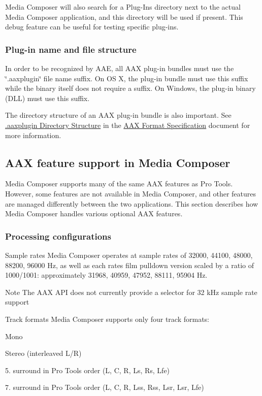 Media Composer will also search for a Plug-\/\+Ins directory next to the actual Media Composer application, and this directory will be used if present. This debug feature can be useful for testing specific plug-\/ins.

\hypertarget{a00361_subsection__media_composer_guide__file_name}{}\subsubsection{Plug-\/in name and file structure}\label{a00361_subsection__media_composer_guide__file_name}
 In order to be recognized by A\+A\+E, all A\+A\+X plug-\/in bundles must use the \char`\"{}.\+aaxplugin\char`\"{} file name suffix. On O\+S X, the plug-\/in bundle must use this suffix while the binary itself does not require a suffix. On Windows, the plug-\/in binary (D\+L\+L) must use this suffix.

The directory structure of an A\+A\+X plug-\/in bundle is also important. See \hyperlink{a00331_commoninterface_formatspecification__aaxplugin_directory_structure}{.aaxplugin Directory Structure} in the \hyperlink{a00331}{A\+A\+X Format Specification} document for more information.



 \hypertarget{a00361_aax_media_composer_guide__features}{}\subsection{A\+A\+X feature support in Media Composer}\label{a00361_aax_media_composer_guide__features}
 Media Composer supports many of the same A\+A\+X features as Pro Tools. However, some features are not available in Media Composer, and other features are managed differently between the two applications. This section describes how Media Composer handles various optional A\+A\+X features.

\hypertarget{a00361_subsection__aax_media_composer_guide__features__processing}{}\subsubsection{Processing configurations}\label{a00361_subsection__aax_media_composer_guide__features__processing}
 Sample rates Media Composer operates at sample rates of 32000, 44100, 48000, 88200, 96000 Hz, as well as each rate\textquotesingle{}s film pulldown version scaled by a ratio of 1000/1001\+: approximately 31968, 40959, 47952, 88111, 95904 Hz.

\begin{DoxyNote}{Note}
The A\+A\+X A\+P\+I does not currently provide a selector for 32 k\+Hz sample rate support
\end{DoxyNote}
Track formats Media Composer supports only four track formats\+: 
\begin{DoxyItemize}
\item Mono 
\item Stereo (interleaved L/\+R)  
\item 5. surround in Pro Tools order (L, C, R, Ls, Rs, Lfe)  
\item 7. surround in Pro Tools order (L, C, R, Lss, Rss, Lsr, Lsr, Lfe)  
\end{DoxyItemize}

